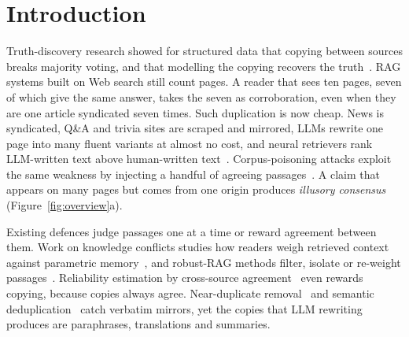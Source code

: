 \documentclass[sigconf,review,anonymous]{acmart}
\begin{document}
\maketitle

\section{Introduction}
Truth-discovery research showed for structured data that copying between sources breaks majority voting, and that
modelling the copying recovers the truth~\cite{dong2009integrating,li2015truthsurvey}. RAG systems built on Web search still count pages. A reader that
sees ten pages, seven of which give the same answer, takes the seven as corroboration, even when they are one article
syndicated seven times. Such duplication is now cheap. News is syndicated, Q\&A and trivia sites are scraped and
mirrored, LLMs rewrite one page into many fluent variants at almost no cost, and neural retrievers rank LLM-written
text above human-written text~\cite{dai2024neural}. Corpus-poisoning attacks exploit the same weakness by injecting
a handful of agreeing passages~\cite{zou2024poisonedrag}. A claim that appears on many pages but comes from one
origin produces \emph{illusory consensus} (Figure~\ref{fig:overview}a).

Existing defences judge passages one at a time or reward agreement between them. Work on knowledge conflicts studies
how readers weigh retrieved context against parametric
memory~\cite{xu2024conflicts,wu2024clasheval,ming2025faitheval,su2024conflictbank,chen2026ragknow}, and robust-RAG
methods filter, isolate or re-weight
passages~\cite{wang2024astute,wei2025instructrag,zhou2025trustrag,xiang2024robustrag,pan2024cag,deng2024cram,wang2025ramdocs}.
Reliability estimation by cross-source agreement~\cite{hwang2024rarag} even rewards copying, because copies always
agree. Near-duplicate removal~\cite{broder1997resemblance} and semantic deduplication~\cite{abbas2023semdedup} catch
verbatim mirrors, yet the copies that LLM rewriting produces are paraphrases, translations and summaries.
\end{document}
